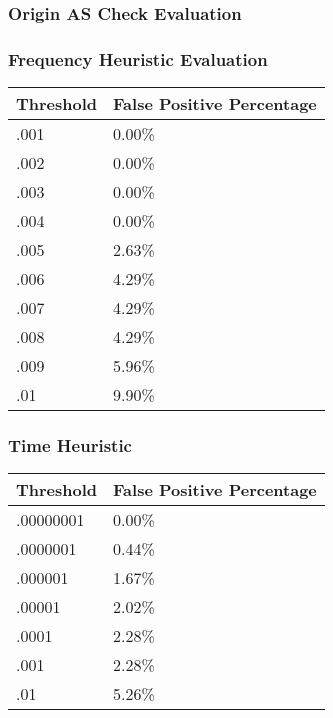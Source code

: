 \subsubsection{Origin AS Check Evaluation}


\subsubsection{Frequency Heuristic Evaluation}

\begin{table}[h]
\begin{center}
    \begin{tabular}{| l | l |}
    \hline
    Threshold & False Positive Percentage \\ \hline \hline
    .001 & 0.00\% \\ \hline
    .002 & 0.00\% \\ \hline
    .003 & 0.00\% \\ \hline
    .004 & 0.00\% \\ \hline
    .005 & 2.63\% \\ \hline
    .006 & 4.29\% \\ \hline
    .007 & 4.29\% \\ \hline
    .008 & 4.29\% \\ \hline
    .009 & 5.96\% \\ \hline
    .01 & 9.90\% \\
    \hline
    \end{tabular}
\end{center}
\end{table}

\subsubsection{Time Heuristic}

\begin{table}[h]
\begin{center}
    \begin{tabular}{| l | l |}
    \hline
    Threshold & False Positive Percentage \\ \hline \hline
    .00000001 & 0.00\% \\ \hline
    .0000001 & 0.44\% \\ \hline
    .000001 & 1.67\% \\ \hline
    .00001 & 2.02\% \\ \hline
    .0001 & 2.28\% \\ \hline
    .001 & 2.28\% \\ \hline
    .01 & 5.26\% \\
    \hline
    \end{tabular}
\end{center}
\end{table}

